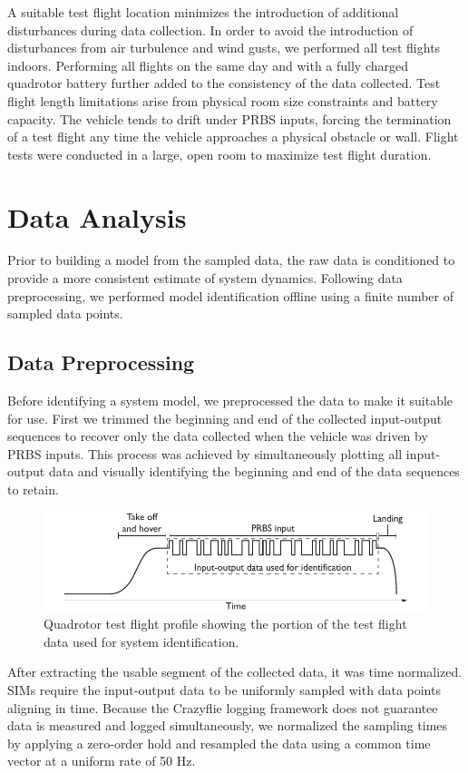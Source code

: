 A suitable test flight location minimizes the introduction of additional disturbances during data collection. In order to avoid the introduction of disturbances from air turbulence and wind gusts, we performed all test flights indoors. Performing all flights on the same day and with a fully charged quadrotor battery further added to the consistency of the data collected. Test flight length limitations arise from physical room size constraints and battery capacity. The vehicle tends to drift under PRBS inputs, forcing the termination of a test flight any time the vehicle approaches a physical obstacle or wall. Flight tests were conducted in a large, open room to maximize test flight duration. 

\section{Data Analysis}
Prior to building a model from the sampled data, the raw data is conditioned to provide a more consistent estimate of system dynamics. Following data preprocessing, we performed model identification offline using a finite number of sampled data points.


\subsection{Data Preprocessing}
Before identifying a system model, we preprocessed the data to make it suitable for use. First we trimmed the beginning and end of the collected input-output sequences to recover only the data collected when the vehicle was driven by PRBS inputs. This process was achieved by simultaneously plotting all input-output data and visually identifying the beginning and end of the data sequences to retain.
\begin{figure}[htb!]
	\centering
	\includegraphics{../fig/test_flight_profile.pdf}
	\caption{Quadrotor test flight profile showing the portion of the test flight data used for system identification.}
	\label{fig:test_flight_profile}
\end{figure}

After extracting the usable segment of the collected data, it was time normalized. SIMs require the input-output data to be uniformly sampled with data points aligning in time. Because the Crazyflie logging framework does not guarantee data is measured and logged simultaneously, we normalized the sampling times by applying a zero-order hold and resampled the data using a common time vector at a uniform rate of 50 Hz.


